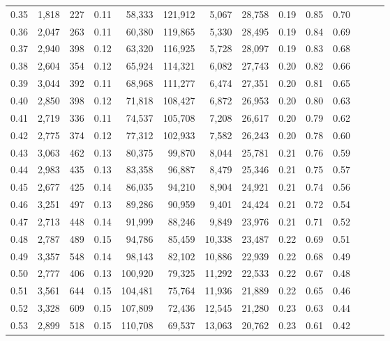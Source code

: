 \begin{tabular}{rrrrrrrrrrrrrr}
0.35 &  1,818 &  227 &  0.11 &   58,333 &  121,912 &   5,067 &  28,758 &  0.19 &  0.85 &      0.70 \\
0.36 &  2,047 &  263 &  0.11 &   60,380 &  119,865 &   5,330 &  28,495 &  0.19 &  0.84 &      0.69 \\
0.37 &  2,940 &  398 &  0.12 &   63,320 &  116,925 &   5,728 &  28,097 &  0.19 &  0.83 &      0.68 \\
0.38 &  2,604 &  354 &  0.12 &   65,924 &  114,321 &   6,082 &  27,743 &  0.20 &  0.82 &      0.66 \\
0.39 &  3,044 &  392 &  0.11 &   68,968 &  111,277 &   6,474 &  27,351 &  0.20 &  0.81 &      0.65 \\
0.40 &  2,850 &  398 &  0.12 &   71,818 &  108,427 &   6,872 &  26,953 &  0.20 &  0.80 &      0.63 \\
0.41 &  2,719 &  336 &  0.11 &   74,537 &  105,708 &   7,208 &  26,617 &  0.20 &  0.79 &      0.62 \\
0.42 &  2,775 &  374 &  0.12 &   77,312 &  102,933 &   7,582 &  26,243 &  0.20 &  0.78 &      0.60 \\
0.43 &  3,063 &  462 &  0.13 &   80,375 &   99,870 &   8,044 &  25,781 &  0.21 &  0.76 &      0.59 \\
0.44 &  2,983 &  435 &  0.13 &   83,358 &   96,887 &   8,479 &  25,346 &  0.21 &  0.75 &      0.57 \\
0.45 &  2,677 &  425 &  0.14 &   86,035 &   94,210 &   8,904 &  24,921 &  0.21 &  0.74 &      0.56 \\
0.46 &  3,251 &  497 &  0.13 &   89,286 &   90,959 &   9,401 &  24,424 &  0.21 &  0.72 &      0.54 \\
0.47 &  2,713 &  448 &  0.14 &   91,999 &   88,246 &   9,849 &  23,976 &  0.21 &  0.71 &      0.52 \\
0.48 &  2,787 &  489 &  0.15 &   94,786 &   85,459 &  10,338 &  23,487 &  0.22 &  0.69 &      0.51 \\
0.49 &  3,357 &  548 &  0.14 &   98,143 &   82,102 &  10,886 &  22,939 &  0.22 &  0.68 &      0.49 \\
0.50 &  2,777 &  406 &  0.13 &  100,920 &   79,325 &  11,292 &  22,533 &  0.22 &  0.67 &      0.48 \\
0.51 &  3,561 &  644 &  0.15 &  104,481 &   75,764 &  11,936 &  21,889 &  0.22 &  0.65 &      0.46 \\
0.52 &  3,328 &  609 &  0.15 &  107,809 &   72,436 &  12,545 &  21,280 &  0.23 &  0.63 &      0.44 \\
0.53 &  2,899 &  518 &  0.15 &  110,708 &   69,537 &  13,063 &  20,762 &  0.23 &  0.61 &      0.42 \\

\end{tabular}
